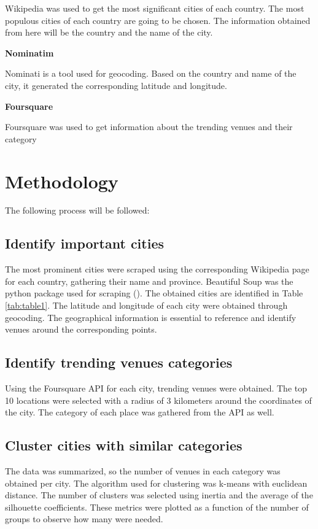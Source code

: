 \documentclass[letterpaper,12pt]{article}
\begin{document}
Wikipedia was used to get the most significant cities of each country. The most populous cities of each country are going to be chosen. The information obtained from here will be the country and the name of the city.

\textbf{Nominatim}

Nominati is a tool used for geocoding. Based on the country and name of the city, it generated the corresponding latitude and longitude. 

\textbf{Foursquare}

Foursquare was used to get information about the trending venues and their category

\section{Methodology}

The following process will be followed:

\subsection{Identify important cities}

The most prominent cities were scraped using the corresponding Wikipedia page for each country, gathering their name and province. Beautiful Soup was the python package used for scraping (\cite{richardson2007beautiful}). The obtained cities are identified in Table \ref{tab:table1}. The latitude and longitude of each city were obtained through geocoding. The geographical information is essential to reference and identify venues around the corresponding points.

\subsection{Identify trending venues categories}

Using the Foursquare API for each city, trending venues were obtained. The top 10 locations were selected with a radius of 3 kilometers around the coordinates of the city. The category of each place was gathered from the API as well. 

\subsection{Cluster cities with similar categories}

The data was summarized, so the number of venues in each category was obtained per city. The algorithm used for clustering was k-means with euclidean distance. The number of clusters was selected using inertia and the average of the silhouette coefficients. These metrics were plotted as a function of the number of groups to observe how many were needed.
\end{document}
